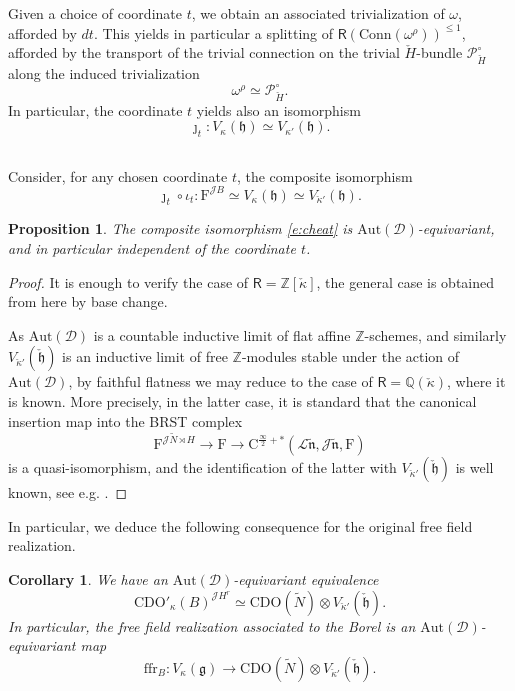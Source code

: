 \documentclass{amsart}
\newtheorem{Prop}[Thm]{Proposition}
\newtheorem{Cor}[Thm]{Corollary}
\theoremstyle{definition}
\newcommand{\fh}{\mathfrak{h}}
\newcommand{\diglet}{\mathrm{F}}
\newcommand{\Fun}{\Ring}
\newcommand{\fg}{\mathfrak{g}}
\newcommand{\D}{\sD}
\newcommand{\sD}{\mathscr{D}}
\newcommand{\on}{\mathrm}
\newcommand{\Ring}{\mathsf{R}}
\newcommand{\Z}{\mathbb{Z}}
\newcommand{\Jet}{\mathscr{J}}
\newcommand{\Loop}{\mathscr{L}}
\newcommand{\CDO}{\mathrm{CDO}}
\newcommand{\ckappa}{\check{\kappa}}
\newcommand{\Aut}{\on{Aut}}
\numberwithin{equation}{section}
\begin{document}
Given a choice of coordinate $t$, we obtain an associated trivialization of $\omega$, afforded by $dt$. This yields in particular a splitting of $\Fun(\on{Conn}(\omega^\rho))^{\leqslant 1}$, afforded by the transport of the trivial connection on the trivial $\check{H}$-bundle $\mathscr{P}^\circ_{\check{H}}$ along the induced trivialization $$\omega^{\rho} \simeq \mathscr{P}^\circ_{\check{H}}.$$ In particular, the coordinate $t$ yields also an isomorphism 
$$\jmath_t: V_{\kappa}(\fh) \simeq V_{\kappa'}(\fh).$$

\subsection{} Consider, for any chosen coordinate $t$, the composite isomorphism 
\begin{equation} \label{e:cheat}\jmath_t \circ \iota_t: \diglet^{\Jet B} \simeq V_\kappa(\fh) \simeq V_{\ckappa'}(\fh).\end{equation}
\fi 

\begin{Prop} \label{p:coordinvarianceofcheat} The composite isomorphism \eqref{e:cheat} is $\on{Aut}(\D)$-equivariant, and in particular independent of the coordinate $t$. 
\end{Prop}

\begin{proof} It is enough to verify the case of $\Ring = \Z[\check{\kappa}]$, the general case is obtained from here by base change. 

As $\on{Aut}(\D)$ is a countable  inductive limit of flat affine $\mathbb{Z}$-schemes, and similarly $V_{\ckappa'}(\check{\mathfrak{h}})$ is an inductive limit of free $\mathbb{Z}$-modules stable under the action of $\on{Aut}(\D)$, by faithful flatness we may  reduce to the case of $\Ring=\mathbb{Q}(\check{\kappa})$, where it is known. More precisely, in the latter case, it is standard that the canonical insertion map into the BRST complex
$$\diglet^{\Jet \tilde{N}\rtimes H} \rightarrow \diglet \rightarrow \on{C}^{\frac{\infty}{2} + *}(\Loop \tilde{\mathfrak{n}}, \Jet\tilde{\mathfrak{n}}, \diglet)  $$ 
is a quasi-isomorphism, and the identification of the latter with $V_{\ckappa'}(\check{\mathfrak{h}})$ is well known, see e.g.    \cite[Section 10.2]{FG}. 
\end{proof}

In particular, we deduce the following consequence for the original free field realization.

\begin{Cor} \label{c:freefieldcoordinv} We have an $\Aut(\sD)$-equivariant equivalence 
$$\CDO'_\kappa(B)^{\Jet H^r} \simeq \CDO(\tilde{N}) \otimes V_{\ckappa'}(\check{\fh}).$$
In particular, the free field realization associated to the Borel is an $\Aut(\sD)$-equivariant map 
$$\on{ffr}_B: V_\kappa(\fg) \rightarrow \CDO(\tilde{N}) \otimes V_{\ckappa'}(\check{\fh}).$$
\end{Cor}
\end{document}
